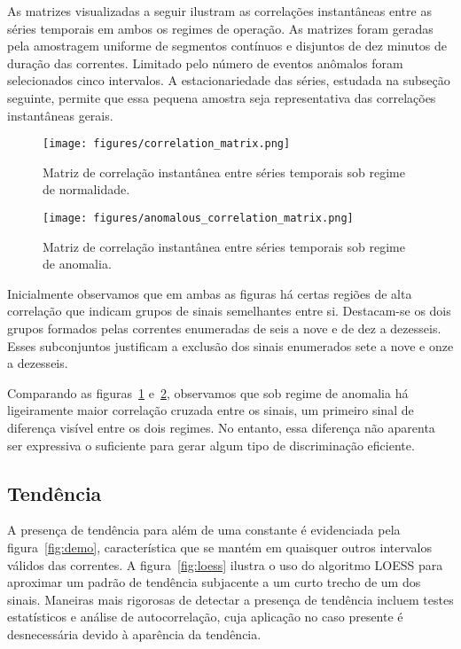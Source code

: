 As matrizes visualizadas a seguir ilustram as correlações instantâneas entre as
séries temporais em ambos os regimes de operação. As matrizes foram geradas
pela amostragem uniforme de segmentos contínuos e disjuntos de dez minutos de
duração das correntes. Limitado pelo número de eventos anômalos foram
selecionados cinco intervalos. A estacionariedade das séries, estudada na
subseção seguinte, permite que essa pequena amostra seja representativa das
correlações instantâneas gerais.

\begin{figure}[H]
    \centering
    \texttt{[image: figures/correlation\_matrix.png]}
    \caption{Matriz de correlação instantânea entre séries temporais sob
    regime de normalidade.}
    \label{fig:demo_matrix}
\end{figure}

\begin{figure}[H]
    \centering
    \texttt{[image: figures/anomalous\_correlation\_matrix.png]}
    \caption{Matriz de correlação instantânea entre séries temporais sob
    regime de anomalia.}
    \label{fig:demo_matrix_anomaly}
\end{figure}

Inicialmente observamos que em ambas as figuras há certas regiões de alta
correlação que indicam grupos de sinais semelhantes entre si. Destacam-se os
dois grupos formados pelas correntes enumeradas de seis a nove e de dez a
dezesseis. Esses subconjuntos justificam a exclusão dos sinais enumerados sete
a nove e onze a dezesseis.

Comparando as figuras~\ref{fig:demo_matrix} e~\ref{fig:demo_matrix_anomaly},
observamos que sob regime de anomalia há ligeiramente maior correlação cruzada
entre os sinais, um primeiro sinal de diferença visível entre os dois regimes.
No entanto, essa diferença não aparenta ser expressiva o suficiente para gerar
algum tipo de discriminação eficiente.

\subsection{Tendência}

A presença de tendência para além de uma constante é evidenciada pela
figura~\ref{fig:demo}, característica que se mantém em quaisquer outros
intervalos válidos das correntes. A figura~\ref{fig:loess} ilustra o uso do
algoritmo LOESS para aproximar um padrão de tendência subjacente a um curto
trecho de um dos sinais. Maneiras mais rigorosas de detectar a presença de
tendência incluem testes estatísticos e análise de autocorrelação, cuja
aplicação no caso presente é desnecessária devido à aparência da tendência.

